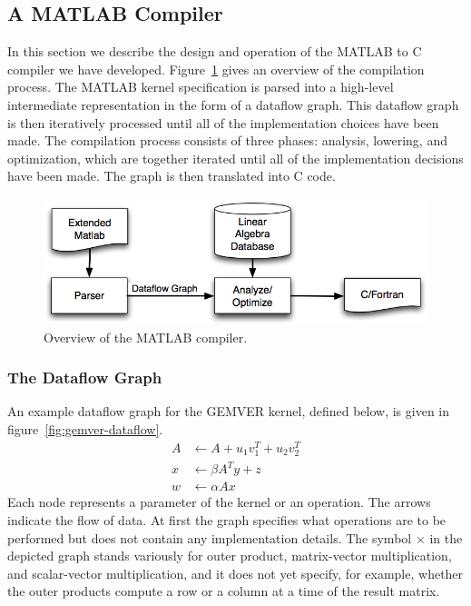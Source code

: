 \documentclass[runningheads]{llncs}
\begin{document}
\subsection{A MATLAB Compiler}
\label{sec:matlab}

In this section we describe the design and operation of the MATLAB to C compiler we have developed.    Figure~\ref{fig:compiler} gives an overview of the compilation process. The MATLAB kernel specification is parsed into a high-level intermediate representation in the form of a dataflow graph.  This dataflow graph is then iteratively processed until all of the implementation choices have been made.  The compilation process consists of three phases: analysis, lowering, and optimization, which are together iterated until all of the implementation decisions have been made.  The graph is then translated into C code.

\begin{figure}[htbp]
\centering
\includegraphics[width=.7\textwidth]{figures/compile.png}

\caption{Overview of the MATLAB compiler.}
\label{fig:compiler}
\end{figure}

\subsubsection{The Dataflow Graph}

An example dataflow graph for the GEMVER kernel, defined below, is given in figure~\ref{fig:gemver-dataflow}.
\begin{align*}
  A &\gets A + u_1 v_1^T + u_2 v_2^T \\[-0.5ex]
  x &\gets \beta A^T y + z \\[-0.5ex]
  w &\gets \alpha A x
\end{align*}
Each node represents a parameter of the kernel or an operation.  The arrows indicate the flow of data. At first the graph specifies what operations are to be performed but does not contain any implementation details. The symbol $\times$ in the depicted graph stands variously for outer product, matrix-vector multiplication, and scalar-vector multiplication, and it does not yet specify, for example, whether the outer products compute a row or a column at a time of the result matrix.
\end{document}
